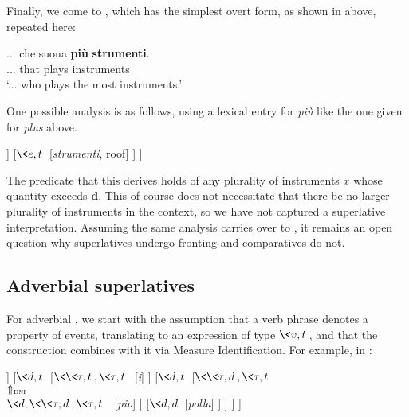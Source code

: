 \documentclass[output=paper
,modfonts
,nonflat]{langsci/langscibook}
\begin{document}
Finally, we come to , which has the simplest overt form, as shown in  above, repeated here:

\ea \label{ex:coppockstrand:105}
\gll ... che suona \textbf{più} \textbf{strumenti}.\\
... that plays \cmpr{} instruments\\ 
\glt `...  who plays the most instruments.'
\z 

One possible analysis is as follows, using a lexical entry for \textit{pi\`u} like the one given for  \textit{plus} above.

\ea \label{ex:coppockstrand:106}
\begin{forest}
	[{$\<e,t\>$\\(by Measure Identification)}
		[{$\<d,t\>$\\$\Uparrow_{\textsc{dni}}$\\$\<d,dt\>$} [\textit{pi\`u}, roof]
		]
		[{$\<e,t\>$} [\textit{strumenti}, roof]
		]
	]
\end{forest}
\z 

The predicate that this derives holds of any plurality of instruments $x$ whose quantity exceeds $\textbf{d}$. This of course does not necessitate that there be no larger plurality of instruments in the context, so we have not captured a superlative interpretation. Assuming the same analysis carries over to , it remains an open question why superlatives undergo fronting and comparatives do not.

\subsection{Adverbial superlatives}

For adverbial , we start with the assumption that a verb phrase denotes a property of events, translating to an expression of type $\<v,t\>$, and that the  construction combines with it via Measure Identification. For example, in :

\ea \label{ex:coppockstrand:107} 
\begin{forest}
	[{$\<v,t\>$\\(by Measure Identification)}
		[{$\<v,t\>$} [VP]
		]
		[{$\<d,t\>$}
			[{$\<\<\tau,t\>,\<\tau,t\>\>$} [\textit{i}]
			]
			[{$\<d,t\>$}
				[{$\<\<\tau,d\>,\<\tau,t\>\>$\\$\Uparrow_{\textsc{dni}}$\\$\<d,\<\<\tau,d\>,\<\tau,t\>\>\>$} [\textit{pio}]
				]
				[{$\<d,d\>$} [\textit{polla}]
				]
			]
		]
	]
\end{forest}
\z 
\end{document}
